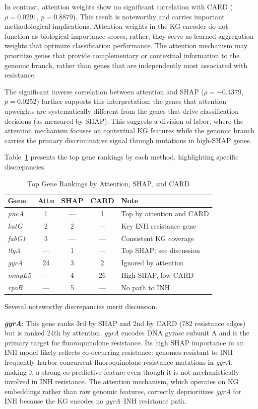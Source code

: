 \documentclass[conference]{IEEEtran}
\begin{document}
In contrast, attention weights show no significant correlation with CARD ($\rho = 0.0291$, $p = 0.8879$). This result is noteworthy and carries important methodological implications. Attention weights in the KG encoder do not function as biological importance scores; rather, they serve as learned aggregation weights that optimize classification performance. The attention mechanism may prioritize genes that provide complementary or contextual information to the genomic branch, rather than genes that are independently most associated with resistance.

The significant inverse correlation between attention and SHAP ($\rho = -0.4379$, $p = 0.0252$) further supports this interpretation: the genes that attention upweights are systematically different from the genes that drive classification decisions (as measured by SHAP). This suggests a division of labor, where the attention mechanism focuses on contextual KG features while the genomic branch carries the primary discriminative signal through mutations in high-SHAP genes.

Table~\ref{tab:generank} presents the top gene rankings by each method, highlighting specific discrepancies.

\begin{table}[t]
\centering
\caption{Top Gene Rankings by Attention, SHAP, and CARD}
\label{tab:generank}
\begin{tabular}{lcccp{2.0cm}}
\toprule
\textbf{Gene} & \textbf{Attn} & \textbf{SHAP} & \textbf{CARD} & \textbf{Note} \\
\midrule
\textit{pncA}  & 1  & --- & 1  & Top by attention and CARD \\
\textit{katG}  & 2  & 2   & --- & Key INH resistance gene \\
\textit{fabG1} & 3  & --- & --- & Consistent KG coverage \\
\textit{tlyA}  & --- & 1  & --- & Top SHAP; see discussion \\
\textit{gyrA}  & 24 & 3   & 2  & Ignored by attention \\
\textit{mmpL5} & --- & 4  & 26 & High SHAP, low CARD \\
\textit{rpoB}  & --- & 5  & --- & No path to INH \\
\bottomrule
\end{tabular}
\end{table}

Several noteworthy discrepancies merit discussion.

\textbf{\textit{gyrA}}: This gene ranks 3rd by SHAP and 2nd by CARD (782 resistance edges) but is ranked 24th by attention. \textit{gyrA} encodes DNA gyrase subunit A and is the primary target for fluoroquinolone resistance. Its high SHAP importance in an INH model likely reflects co-occurring resistance: genomes resistant to INH frequently harbor concurrent fluoroquinolone resistance mutations in \textit{gyrA}, making it a strong co-predictive feature even though it is not mechanistically involved in INH resistance. The attention mechanism, which operates on KG embeddings rather than raw genomic features, correctly deprioritizes \textit{gyrA} for INH because the KG encodes no \textit{gyrA}--INH resistance path.
\end{document}

